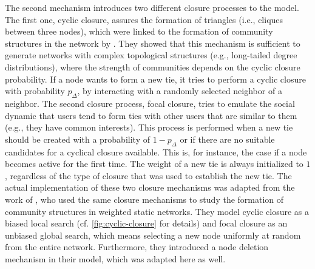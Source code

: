 The second mechanism introduces two different closure processes to the model.
The first one, cyclic closure, assures the formation of triangles (i.e., cliques between three nodes), which were linked to the formation of community structures in the network by \citet{Bianconi2014}.
They showed that this mechanism is sufficient to generate networks with complex topological structures (e.g., long-tailed degree distributions), where the strength of communities depends on the cyclic closure probability.
If a node wants to form a new tie, it tries to perform a cyclic closure with probability \( p_{\Delta} \), by interacting with a randomly selected neighbor of a neighbor.
The second closure process, focal closure, tries to emulate the social dynamic that users tend to form ties with other users that are similar to them (e.g., they have common interests).
This process is performed when a new tie should be created with a probability of \( 1 - p_{\Delta} \) or if there are no suitable candidates for a cyclical closure available.
This is, for instance, the case if a node becomes active for the first time.
The weight of a new tie is always initialized to \(1\), regardless of the type of closure that was used to establish the new tie.
The actual implementation of these two closure mechanisms was adapted from the work of \citet{Kumpula2007}, who used the same closure mechanisms to study the formation of community structures in weighted static networks.
They model cyclic closure as a biased local search (cf. \cref{fig:cyclic-closure} for details) and focal closure as an unbiased global search, which means selecting a new node uniformly at random from the entire network.
Furthermore, they introduced a node deletion mechanism in their model, which was adapted here as well.


